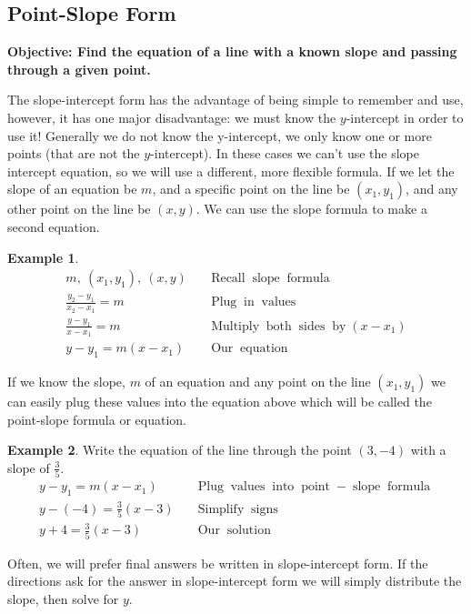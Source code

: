 \documentclass[12pt]{book}
\theoremstyle{definition}
\newtheorem{example}{Example}
\newcommand{\tmop}[1]{\ensuremath{\operatorname{#1}}}
\begin{document}
\subsection{Point-Slope Form}
{\bf Objective: Find the equation of a line with a known slope and passing through a given point.}\par
The slope-intercept form has the advantage of being simple to remember and use, however, it has one major disadvantage: we must know the $y$-intercept in order to use it! Generally we do not know the y-intercept, we only know one or more points (that are not the $y$-intercept). In these cases we can't use the slope intercept equation, so we will use a different, more flexible formula. If we let the slope of an equation be $m$, and a specific point on the line be $(x_1, y_1)$, and any other point on the line be $(x, y)$. We can use the slope formula to make a second equation.
\begin{example}\label{Lin62}
  \begin{eqnarray*}
    m,~ (x_1, y_1),~ (x, y) &  & \tmop{Recall} \tmop{slope} \tmop{formula}\\
    \frac{y_2 - y_1}{x_2 - x_1} = m &  & \tmop{Plug} \tmop{in} \tmop{values}\\
    \frac{y - y_1}{x - x_1} = m &  & \tmop{Multiply} \tmop{both} \tmop{sides}
    \tmop{by} (x - x_1)\\
    y - y_1 = m (x - x_1) &  & \tmop{Our} \tmop{equation}
  \end{eqnarray*}
\end{example}
If we know the slope, $m$ of an equation and any point on the line $(x_1,y_1)$ we can easily plug these values into the equation above which will be called the point-slope formula or equation.
\begin{center}
\end{center}
\begin{example}\label{Lin63} Write the equation of the line through the point $(3, - 4)$ with a slope of $\displaystyle\frac{3}{5}$.
  \begin{eqnarray*}
    y - y_1 = m (x - x_1) &  & \tmop{Plug} \tmop{values} \tmop{into}
    \tmop{point} - \tmop{slope} \tmop{formula}\\
    y - (- 4) = \frac{3}{5} (x - 3) &  & \tmop{Simplify} \tmop{signs}\\
    y + 4 = \frac{3}{5} (x - 3) &  & \tmop{Our} \tmop{solution}
  \end{eqnarray*}
\end{example}
Often, we will prefer final answers be written in slope-intercept form. If the directions ask for the answer in slope-intercept form we will simply distribute the slope, then solve for $y$.
\end{document}
